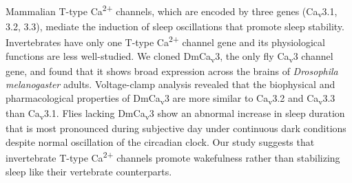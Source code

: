 Mammalian T-type Ca\textsuperscript{2+} channels, which are encoded by three genes (Ca\textsubscript{v}3.1, 3.2, 3.3), mediate the induction of sleep oscillations that promote sleep stability.
Invertebrates have only one T-type Ca\textsuperscript{2+} channel gene and its physiological functions are less well-studied.
We cloned DmCa\textsubscript{v}3, the only fly Ca\textsubscript{v}3 channel gene, and found that it shows broad expression across the brains of \emph{Drosophila melanogaster} adults.
Voltage-clamp analysis revealed that the biophysical and pharmacological properties of DmCa\textsubscript{v}3 are more similar to Ca\textsubscript{v}3.2 and Ca\textsubscript{v}3.3 than Ca\textsubscript{v}3.1.
Flies lacking DmCa\textsubscript{v}3 show an abnormal increase in sleep duration that is most pronounced during subjective day under continuous dark conditions despite normal oscillation of the circadian clock.
Our study suggests that invertebrate T-type Ca\textsuperscript{2+} channels promote wakefulness rather than stabilizing sleep like their vertebrate counterparts.
    